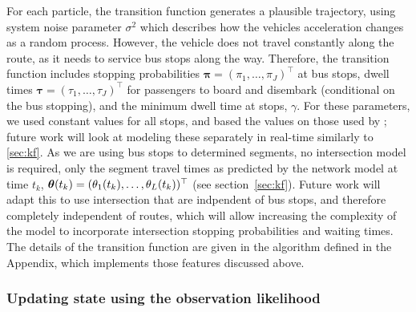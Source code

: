 For each particle, the transition function generates a plausible trajectory,
using system noise parameter $\sigma^2$ which describes 
how the vehicles acceleration changes as a random process.
However, the vehicle does not travel constantly along the route,
as it needs to service bus stops along the way.
Therefore, the transition function includes 
stopping probabilities $\boldsymbol\pi = (\pi_1,\ldots,\pi_J)^\top$ at bus stops,
dwell times $\boldsymbol\tau = (\tau_1,\ldots,\tau_J)^\top$ for passengers to
board and disembark (conditional on the bus stopping),
and the minimum dwell time at stops, $\gamma$.
For these parameters, we used constant values for all stops,
and based the values on those used by \cite{Hans_2015};
future work will look at modeling these separately in real-time similarly to \ref{sec:kf}.
As we are using bus stops to determined segments,
no intersection model is required,
only the segment travel times as predicted by the network model at time $t_k$,
$\boldsymbol{\theta}(t_k) = (\theta_1(t_k), \ldots, \theta_L(t_k))^\top$
(see section~\ref{sec:kf}).
Future work will adapt this to use intersection that are indpendent 
of bus stops, and therefore completely independent of routes,
which will allow increasing the complexity of the model to incorporate
intersection stopping probabilities and waiting times.
The details of the transition function are given in the algorithm defined in the Appendix,
which implements those features discussed above.



\subsubsection{Updating state using the observation likelihood}
\label{sec:pf_update}


